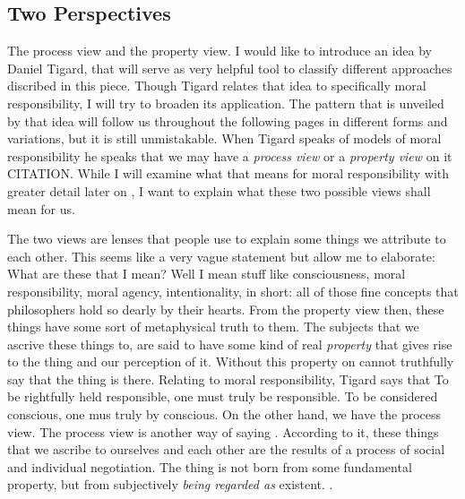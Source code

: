 \documentclass{article}
\begin{document}
\subsection{Two Perspectives}




The process view and the property view.
I would like to introduce an idea by Daniel Tigard, that will serve as very
helpful tool to classify different approaches discribed in this piece. Though
Tigard relates that idea to specifically moral responsibility, I will try to
broaden its application. The pattern that is unveiled by that idea will follow
us throughout the following pages in different forms and variations, but it is
still unmistakable. When Tigard speaks of models of moral responsibility he
speaks that we may have a \textit{process view} or a \textit{property view} on
it CITATION. While I will examine what that means for moral responsibility with greater
detail later on
, I want to explain what these two possible views shall mean for us.

The two views are lenses that people use to explain some things we attribute to
each other. This seems like a very vague statement but allow me to elaborate:
What are these  that I mean? Well I mean stuff like consciousness,
moral responsibility, moral agency, intentionality, in short: all of those fine
concepts that philosophers hold so dearly by their hearts. From the property
view then, these things have some sort of metaphysical truth to them. The
subjects that we ascrive these things to, are said to have some kind of real
\textit{property} that gives rise to the thing and our perception of it. Without
this property on cannot truthfully say that the thing is there. Relating to
moral responsibility, Tigard says that 
To be rightfully held responsible, one must truly be responsible. To be
considered conscious, one mus truly by conscious. On the other hand, we have the
process view. The process view is another way of saying . According to it, these things that we ascribe to ourselves and each
other are the results of a process of social and individual negotiation. The
thing is not born from some fundamental property, but from subjectively
\textit{being regarded as} existent. .
\end{document}
